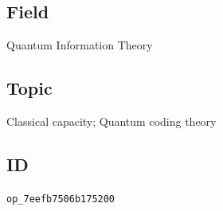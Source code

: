 \subsection*{Field}

Quantum Information Theory

\subsection*{Topic}

Classical capacity; Quantum coding theory

\subsection*{ID}

\texttt{op\_7eefb7506b175200}
